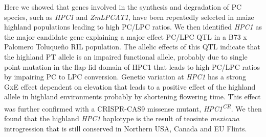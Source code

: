 \documentclass[9pt,twocolumn,twoside,lineno]{BioRxiv}
\begin{document}
Here we showed that genes involved in the synthesis and degradation of PC species, such as \textit{HPC1} and \textit{ZmLPCAT1}, have been repeatedly selected in maize highland populations leading to high PC/LPC ratios.   
We then identified \textit{HPC1} as the major candidate gene explaining a major effect PC/LPC QTL in a B73 x Palomero Toluqueño RIL population. 
The allelic effects of this QTL indicate that the highland PT allele is an impaired functional allele, probably due to single point mutation in the flap-lid domain of HPC1 that leads to high PC/LPC ratios by impairing PC to LPC conversion. 
Genetic variation at \textit{HPC1} has a strong GxE effect dependent on elevation that leads to a positive effect of the highland allele in highland environments probably by shortening flowering time.
This effect was further confirmed with a CRISPR-CAS9 missense mutant, \textit{HPC1\textsuperscript{CR}}.
We then found that the highland \textit{HPC1} haplotype is the result of teosinte \textit{mexicana} introgression that is still conserved in Northern USA, Canada and EU Flints. 
\end{document}
